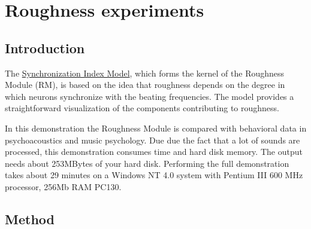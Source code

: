 \newpage
\section{Roughness experiments}

\hypertarget{Concepts:IPEMRoughnessDemo}{}
\hypertarget{Concepts:IPEMGenerateANIForRoughnessTest}{}
\hypertarget{Concepts:IPEMGenerateANIForScales}{}
\hypertarget{Concepts:IPEMRoughnessRun}{}

\subsection{Introduction}
The \hyperlink{Concepts:Roughness Module}{Synchronization Index
Model}, which forms the kernel of the Roughness Module (RM), is
based on the idea that roughness depends on the degree in which
neurons synchronize with the beating frequencies. The model
provides a straightforward visualization of the components
contributing to roughness.

In this demonstration the Roughness Module is compared with
behavioral data in psychoacoustics and music psychology. Due due
the fact that a lot of sounds are processed, this demonstration
consumes time and hard disk memory. The output needs about
253MBytes of your hard disk. Performing the full demonstration
takes about 29 minutes on a Windows NT 4.0 system with Pentium
III 600 MHz processor, 256Mb RAM PC130.

\subsection{Method}

\IPEMTBC

